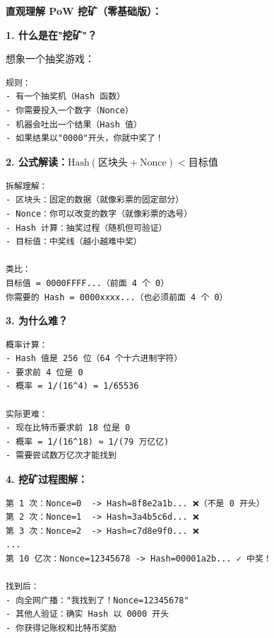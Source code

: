 \begin{theorybox}
\textbf{直观理解 PoW 挖矿（零基础版）：}

\textbf{1. 什么是在"挖矿"？}

想象一个抽奖游戏：
\begin{lstlisting}
规则：
- 有一个抽奖机（Hash 函数）
- 你需要投入一个数字（Nonce）
- 机器会吐出一个结果（Hash 值）
- 如果结果以"0000"开头，你就中奖了！
\end{lstlisting}

\textbf{2. 公式解读：$\text{Hash}(\text{区块头} + \text{Nonce}) < \text{目标值}$}

\begin{lstlisting}
拆解理解：
- 区块头：固定的数据（就像彩票的固定部分）
- Nonce：你可以改变的数字（就像彩票的选号）
- Hash 计算：抽奖过程（随机但可验证）
- 目标值：中奖线（越小越难中奖）

类比：
目标值 = 0000FFFF...（前面 4 个 0）
你需要的 Hash = 0000xxxx...（也必须前面 4 个 0）
\end{lstlisting}

\textbf{3. 为什么难？}

\begin{lstlisting}
概率计算：
- Hash 值是 256 位（64 个十六进制字符）
- 要求前 4 位是 0
- 概率 = 1/(16^4) = 1/65536

实际更难：
- 现在比特币要求前 18 位是 0
- 概率 = 1/(16^18) ≈ 1/(79 万亿亿)
- 需要尝试数万亿次才能找到
\end{lstlisting}

\textbf{4. 挖矿过程图解：}

\begin{lstlisting}
第 1 次：Nonce=0  -> Hash=8f8e2a1b... ❌（不是 0 开头）
第 2 次：Nonce=1  -> Hash=3a4b5c6d... ❌
第 3 次：Nonce=2  -> Hash=c7d8e9f0... ❌
...
第 10 亿次：Nonce=12345678 -> Hash=00001a2b... ✓ 中奖！

找到后：
- 向全网广播："我找到了！Nonce=12345678"
- 其他人验证：确实 Hash 以 0000 开头
- 你获得记账权和比特币奖励
\end{lstlisting}
\end{theorybox}

